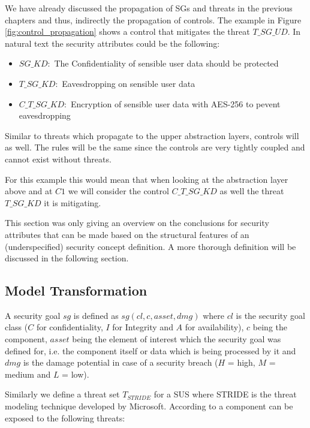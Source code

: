 We have already discussed the propagation of SGs and threats in the previous chapters and thus, indirectly the propagation of controls. The example in Figure \ref{fig:control_propagation} shows a control that mitigates the threat $T\_SG\_UD$. In natural text the security attributes could be the following:

\begin{itemize}
\item[]\textbf{$SG\_KD:$} The Confidentiality of sensible user data should be protected
\item[]\textbf{$T\_SG\_KD:$} Eavesdropping on sensible user data
\item[]\textbf{$C\_T\_SG\_KD:$} Encryption of sensible user data with AES-256 to pevent eavesdropping
\end{itemize}

Similar to threats which propagate to the upper abstraction layers, controls will as well. The rules will be the same since the controls are very tightly coupled and cannot exist without threats.

For this example this would mean that when looking at the abstraction layer above and at $C1$ we will consider the control $C\_T\_SG\_KD$ as well the threat $T\_SG\_KD$ it is mitigating.

This section was only giving an overview on the conclusions for security attributes that can be made based on the structural features of an (underspecified) security concept definition. A more thorough definition will be discussed in the following section. 

\subsection{Model Transformation}

A security goal $sg$ is defined as $sg(cl, c, asset, dmg)$ where $cl$ is the security goal class ($C$ for confidentiality, $I$ for Integrity and $A$ for availability), $c$ being the component, $asset$ being the element of interest which the security goal was defined for, i.e. the component itself or data which is being processed by it and $dmg$ is the damage potential in case of a security breach ($H$ = high, $M$ = medium and $L$ = low).

Similarly we define a threat set $T_{STRIDE}$ for a SUS where STRIDE is the threat modeling technique developed by Microsoft. According to \cite{torr} a component can be exposed to the following threats:


